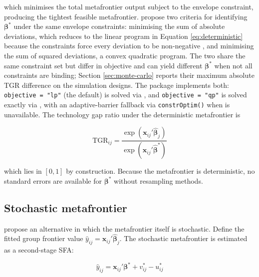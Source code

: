 which minimises the total metafrontier output subject to the envelope
constraint, producing the tightest feasible metafrontier. \citet{battese2004}
propose two criteria for identifying \(\boldsymbol{\beta}^*\) under the same
envelope constraints: minimising the sum of absolute deviations, which
reduces to the linear program in Equation \eqref{eq:deterministic} because the
constraints force every deviation to be non-negative \citep[
Eqs. 23--25]{odonnell2008}, and minimising the sum of squared deviations, a convex
quadratic program. The two share the same constraint set but differ in
objective and can yield different \(\boldsymbol{\beta}^*\) when not all
constraints are binding; Section \ref{sec:monte-carlo} reports their maximum absolute TGR
difference on the simulation designs. The package implements both:
\texttt{objective\ =\ "lp"} (the default) is solved via 
\citep{lpSolveAPI}, and \texttt{objective\ =\ "qp"} is solved exactly via
 \citep{quadprog}, with an adaptive-barrier fallback via
\texttt{constrOptim()} when  is unavailable. The technology gap
ratio under the deterministic metafrontier is

\begin{equation}
\text{TGR}_{ij} =
\frac{\exp(\mathbf{x}_{ij}'\widehat{\boldsymbol{\beta}}_j)}
     {\exp(\mathbf{x}_{ij}'\widehat{\boldsymbol{\beta}}^*)}
\label{eq:tgr-det}
\end{equation}

which lies in \([0, 1]\) by construction. Because the metafrontier is
deterministic, no standard errors are available for \(\boldsymbol{\beta}^*\)
without resampling methods.

\subsection{Stochastic metafrontier}\label{sec:stoch-metafrontier}

\citet{huang2014} propose an alternative in which the metafrontier itself is
stochastic. Define the fitted group frontier value
\(\widehat{y}_{ij} = \mathbf{x}_{ij}'\widehat{\boldsymbol{\beta}}_j\). The stochastic
metafrontier is estimated as a second-stage SFA:

\begin{equation}
\widehat{y}_{ij} = \mathbf{x}_{ij}'\boldsymbol{\beta}^* + v^*_{ij} - u^*_{ij}
\label{eq:stochastic}
\end{equation}

